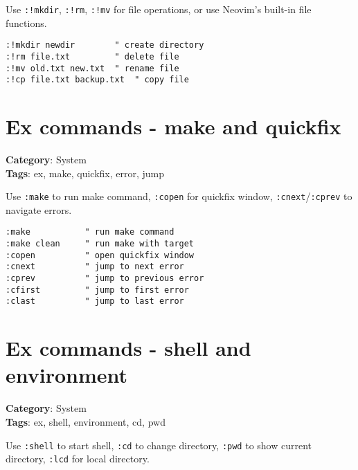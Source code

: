 {{{{{{{{{{{{{{Use {\footnotesize \Verb§:!mkdir§}, {\footnotesize \Verb§:!rm§}, {\footnotesize \Verb§:!mv§} for file operations, or use Neovim's built-in file functions.

\begin{Exa*}{}
\begin{Verbatim}[fontsize=\footnotesize, breaklines, breakanywhere]
:!mkdir newdir        " create directory
:!rm file.txt         " delete file
:!mv old.txt new.txt  " rename file
:!cp file.txt backup.txt  " copy file
\end{Verbatim}
\end{Exa*}

\section{Ex commands - make and quickfix}

\textbf{Category}: System\\ \textbf{Tags}: ex, make, quickfix, error, jump
\vspace{0.5cm}

Use {\footnotesize \Verb§:make§} to run make command, {\footnotesize \Verb§:copen§} for quickfix window, {\footnotesize \Verb§:cnext§}/{\footnotesize \Verb§:cprev§} to navigate errors.

\begin{Exa*}{}
\begin{Verbatim}[fontsize=\footnotesize, breaklines, breakanywhere]
:make           " run make command
:make clean     " run make with target
:copen          " open quickfix window
:cnext          " jump to next error
:cprev          " jump to previous error
:cfirst         " jump to first error
:clast          " jump to last error
\end{Verbatim}
\end{Exa*}

\section{Ex commands - shell and environment}

\textbf{Category}: System\\ \textbf{Tags}: ex, shell, environment, cd, pwd
\vspace{0.5cm}

Use {\footnotesize \Verb§:shell§} to start shell, {\footnotesize \Verb§:cd§} to change directory, {\footnotesize \Verb§:pwd§} to show current directory, {\footnotesize \Verb§:lcd§} for local directory.

}}}}}}}}}}}}}}
